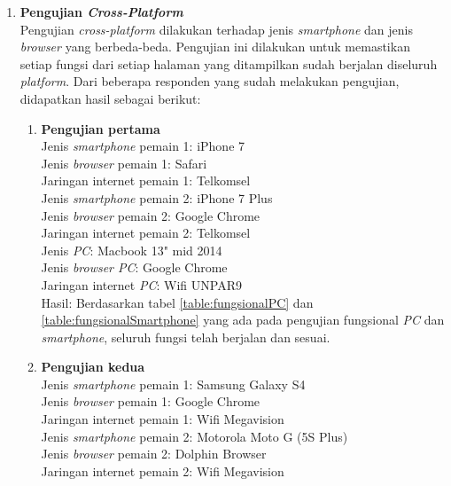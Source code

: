 \begin{enumerate}
	\item \textbf{Pengujian \textit{Cross-Platform}} \\
	Pengujian \textit{cross-platform} dilakukan terhadap jenis \textit{smartphone} dan jenis \textit{browser} yang berbeda-beda. Pengujian ini dilakukan untuk memastikan setiap fungsi dari setiap halaman yang ditampilkan sudah berjalan diseluruh \textit{platform}. Dari beberapa responden yang sudah melakukan pengujian, didapatkan hasil sebagai berikut:
	
	\begin{enumerate}
		\item \textbf{Pengujian pertama} \\
		Jenis \textit{smartphone} pemain 1: iPhone 7 \\
		Jenis \textit{browser} pemain 1: Safari\\
		Jaringan internet pemain 1: Telkomsel\\
		
		Jenis \textit{smartphone} pemain 2: iPhone 7 Plus\\
		Jenis \textit{browser} pemain 2: Google Chrome\\
		Jaringan internet pemain 2: Telkomsel\\
		
		Jenis \textit{PC}: Macbook 13" mid 2014\\
		Jenis \textit{browser PC}: Google Chrome\\
		Jaringan internet \textit{PC}: Wifi UNPAR9\\
		
		Hasil: Berdasarkan tabel \ref{table:fungsionalPC} dan \ref{table:fungsionalSmartphone} yang ada pada pengujian fungsional \textit{PC} dan \textit{smartphone}, seluruh fungsi telah berjalan dan sesuai.
		
		\item \textbf{Pengujian kedua} \\
		Jenis \textit{smartphone} pemain 1: Samsung Galaxy S4\\
		Jenis \textit{browser} pemain 1: Google Chrome\\
		Jaringan internet pemain 1: Wifi Megavision\\
		
		Jenis \textit{smartphone} pemain 2: Motorola Moto G (5S Plus)\\
		Jenis \textit{browser} pemain 2: Dolphin Browser\\
		Jaringan internet pemain 2: Wifi Megavision\\
		

\end{enumerate}
\end{enumerate}
